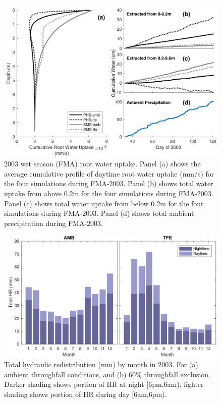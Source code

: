 \documentclass[draft,linenumbers]{agujournal}
\begin{document}
        \clearpage
    \begin{figure}[h]
     \centering
     \includegraphics[width=30pc]{../figs2/fig8.pdf}
     \caption{2003 wet season (FMA) root water uptake. 
     Panel (a) shows the average cumulative profile of daytime root water uptake (mm/s) for the four simulations during FMA-2003.
     Panel (b) shows total water uptake from above 0.2m for the four simulations during FMA-2003.
     Panel (c) shows total water uptake from below 0.2m for the four simulations during FMA-2003. 
     Panel (d) shows total ambient precipitation during FMA-2003. 
     }
     \label{fig8}
  \end{figure}
  
    \clearpage
    \begin{figure}[h]
     \centering
     \includegraphics[width=30pc]{../figs2/fig9.pdf}
     \caption{Total hydraulic redistribution (mm) by month in 2003. For (a) ambient throughfall conditions, and (b) 60\% throughfall exclusion. 
     Darker shading shows portion of HR at night [6pm,6am), lighter shading shows portion of HR during day [6am,6pm).}
     \label{fig9}
  \end{figure}
  
\end{document}
